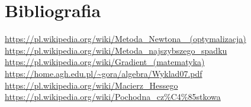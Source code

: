 \documentclass[11pt, leqno]{scrartcl}
\begin{document}
    \section{Bibliografia}
    \url{https://pl.wikipedia.org/wiki/Metoda_Newtona_
        (optymalizacja)} \\
    \url{https://pl.wikipedia.org/wiki/Metoda_najszybszego_spadku} \\
    \url{https://pl.wikipedia.org/wiki/Gradient_(matematyka)} \\
    \url{https://home.agh.edu.pl/~gora/algebra/Wyklad07.pdf} \\
    \url{https://pl.wikipedia.org/wiki/Macierz_Hessego} \\
    \url{https://pl.wikipedia.org/wiki/Pochodna_cz%C4%85stkowa}
\end{document}
